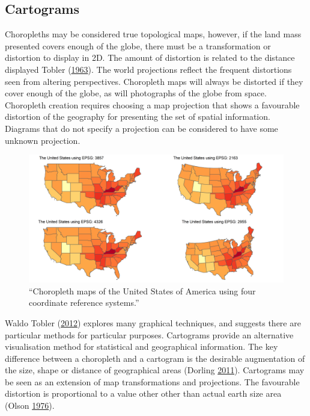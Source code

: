\documentclass[11pt,]{article}
\begin{document}
\hypertarget{cartograms}{%
\subsection{Cartograms}\label{cartograms}}

Choropleths may be considered true topological maps, however, if the
land mass presented covers enough of the globe, there must be a
transformation or distortion to display in 2D. The amount of distortion
is related to the distance displayed Tobler
(\protect\hyperlink{ref-GAMP}{1963}). The world projections reflect the
frequent distortions seen from altering perspectives. Choropleth maps
will always be distorted if they cover enough of the globe, as will
photographs of the globe from space. Choropleth creation requires
choosing a map projection that shows a favourable distortion of the
geography for presenting the set of spatial information. Diagrams that
do not specify a projection can be considered to have some unknown
projection.

\begin{figure}
\centering
\includegraphics{figures/ggchoroCRS.png}
\caption{``Choropleth maps of the United States of America using four
coordinate reference systems.''}
\end{figure}

Waldo Tobler (\protect\hyperlink{ref-TVSSS}{2012}) explores many
graphical techniques, and suggests there are particular methods for
particular purposes. Cartograms provide an alternative visualisation
method for statistical and geographical information. The key difference
between a choropleth and a cartogram is the desirable augmentation of
the size, shape or distance of geographical areas (Dorling
\protect\hyperlink{ref-ACTUC}{2011}). Cartograms may be seen as an
extension of map transformations and projections. The favourable
distortion is proportional to a value other other than actual earth size
area (Olson \protect\hyperlink{ref-NAC}{1976}).
\end{document}
